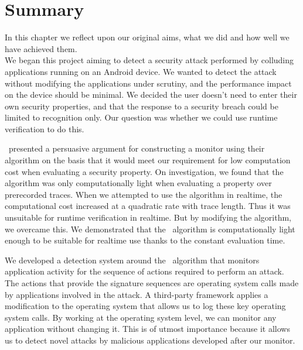 \chapter{Summary}
\label{chap:Summary}



In this chapter we reflect upon our original aims, what we did and how well we have achieved them.\\

\noindent
We began this project aiming to detect a security attack performed by colluding applications running on an Android device.  We wanted to detect the attack without modifying the applications under scrutiny, and the performance impact on the device should be minimal.  We decided the user doesn't need to enter their own security properties, and that the response to a security breach could be limited to recognition only.  Our question was whether we could use runtime verification to do this.

\GRKH\ presented a persuasive argument for constructing a monitor using their algorithm on the basis that it would meet our requirement for low computation cost when evaluating a security property.  On investigation, we found that the algorithm was only computationally light when evaluating a property over prerecorded traces.   When we attempted to use the algorithm in realtime, the computational cost increased at a quadratic rate with trace length.  Thus it was unsuitable for runtime verification in realtime.  But by modifying the algorithm, we overcame this.  We demonstrated that the \RRH\ algorithm is computationally light enough to be suitable for realtime use thanks to the constant evaluation time.

We developed a detection system around the \RRH\ algorithm that monitors application activity for the sequence of actions required to perform an attack.  The actions that provide the signature sequences are operating system calls made by applications involved in the attack.  A third-party framework applies a modification to the operating system that allows us to log these key operating system calls.  By working at the operating system level, we can monitor any application without changing it.  This is of utmost importance because it allows us to detect novel attacks by malicious applications developed after our monitor.\\

